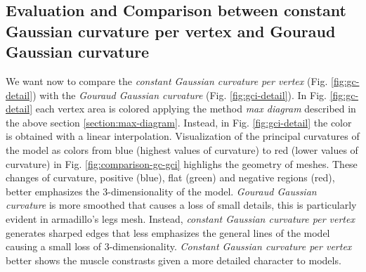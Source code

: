 \subsection{Evaluation and Comparison between constant Gaussian curvature per vertex and Gouraud Gaussian curvature}
We want now to compare the \textit{constant Gaussian curvature per vertex} (Fig. \ref{fig:gc-detail}) with the \textit{Gouraud Gaussian curvature} (Fig. \ref{fig:gci-detail}).
In Fig. \ref{fig:gc-detail} each vertex area is colored applying the method \textit{max diagram} described in the above section \ref{section:max-diagram}. Instead, in Fig. \ref{fig:gci-detail} the color is obtained with a linear interpolation.
Visualization of the principal curvatures of the model as colors from blue (highest values of curvature) to red (lower values of curvature) in Fig. \ref{fig:comparison-gc-gci} highlighs the geometry of meshes.
These changes of curvature, positive (blue), flat (green) and negative regions (red), better emphasizes the 3-dimensionality of the model.
\textit{Gouraud Gaussian curvature} is more smoothed that causes a loss of small details, this is particularly evident in armadillo's legs mesh. Instead, \textit{constant Gaussian curvature per vertex} generates sharped edges that less emphasizes the general lines of the model causing a small loss of 3-dimensionality.
\textit{Constant Gaussian curvature per vertex} better shows the muscle constrasts given a more detailed character to models.

